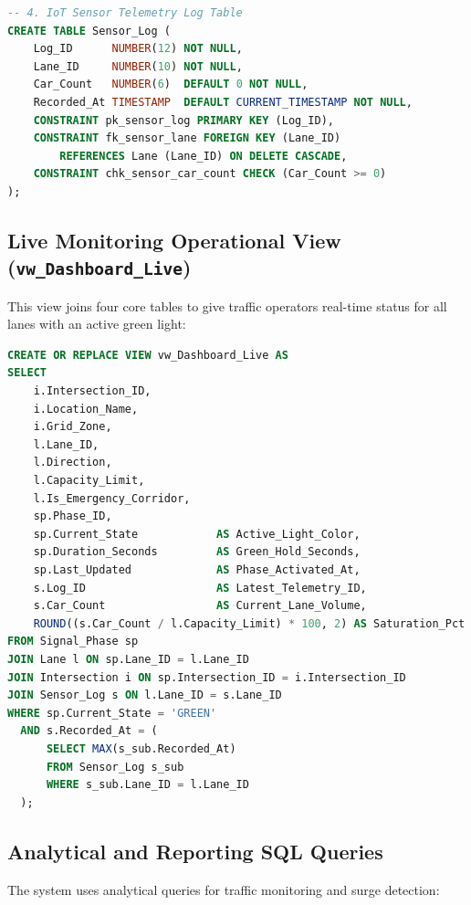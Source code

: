 \documentclass[11pt,a4paper]{article}
\begin{document}
\begin{lstlisting}[language=SQL, caption={DDL Table Creation for Core Traffic Tables}]
-- 4. IoT Sensor Telemetry Log Table
CREATE TABLE Sensor_Log (
    Log_ID      NUMBER(12) NOT NULL,
    Lane_ID     NUMBER(10) NOT NULL,
    Car_Count   NUMBER(6)  DEFAULT 0 NOT NULL,
    Recorded_At TIMESTAMP  DEFAULT CURRENT_TIMESTAMP NOT NULL,
    CONSTRAINT pk_sensor_log PRIMARY KEY (Log_ID),
    CONSTRAINT fk_sensor_lane FOREIGN KEY (Lane_ID)
        REFERENCES Lane (Lane_ID) ON DELETE CASCADE,
    CONSTRAINT chk_sensor_car_count CHECK (Car_Count >= 0)
);
\end{lstlisting}

\subsection{Live Monitoring Operational View (\texttt{vw\_Dashboard\_Live})}
This view joins four core tables to give traffic operators real-time status for all lanes with an active green light:

\begin{lstlisting}[language=SQL, caption={Multi-Table Live Operational View}]
CREATE OR REPLACE VIEW vw_Dashboard_Live AS
SELECT 
    i.Intersection_ID,
    i.Location_Name,
    i.Grid_Zone,
    l.Lane_ID,
    l.Direction,
    l.Capacity_Limit,
    l.Is_Emergency_Corridor,
    sp.Phase_ID,
    sp.Current_State            AS Active_Light_Color,
    sp.Duration_Seconds         AS Green_Hold_Seconds,
    sp.Last_Updated             AS Phase_Activated_At,
    s.Log_ID                    AS Latest_Telemetry_ID,
    s.Car_Count                 AS Current_Lane_Volume,
    ROUND((s.Car_Count / l.Capacity_Limit) * 100, 2) AS Saturation_Pct
FROM Signal_Phase sp
JOIN Lane l ON sp.Lane_ID = l.Lane_ID
JOIN Intersection i ON sp.Intersection_ID = i.Intersection_ID
JOIN Sensor_Log s ON l.Lane_ID = s.Lane_ID
WHERE sp.Current_State = 'GREEN'
  AND s.Recorded_At = (
      SELECT MAX(s_sub.Recorded_At)
      FROM Sensor_Log s_sub
      WHERE s_sub.Lane_ID = l.Lane_ID
  );
\end{lstlisting}

\subsection{Analytical and Reporting SQL Queries}
The system uses analytical queries for traffic monitoring and surge detection:
\end{document}
